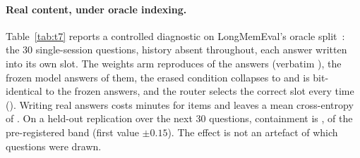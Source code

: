 \documentclass[11pt]{article}
\begin{document}
\paragraph{Real content, under oracle indexing.} Table~\ref{tab:t7} reports a
controlled diagnostic on LongMemEval's oracle split~\cite{longmembench}: the 30
single-session questions, history absent throughout, each answer written into its
own slot. The weights arm reproduces \tLongMemOn{} of the answers (verbatim
\tLongMemFull{}), the frozen model answers \tLongMemFrozen{} of them, the erased
condition collapses to \tLongMemOff{} and is bit-identical to the frozen answers,
and the router selects the correct slot every time (\tLongMemRouting). Writing real
answers costs \tLongMemWriteMin{} minutes for \tLongMemSubset{} items and leaves a
mean cross-entropy of \tLongMemCe{}. On a held-out replication over the next 30
questions, containment is \tHoldoutOn{}, \tHoldoutVerdict{} of the pre-registered band (first value $\pm 0.15$). The effect is not an artefact of which questions were drawn.
\end{document}
